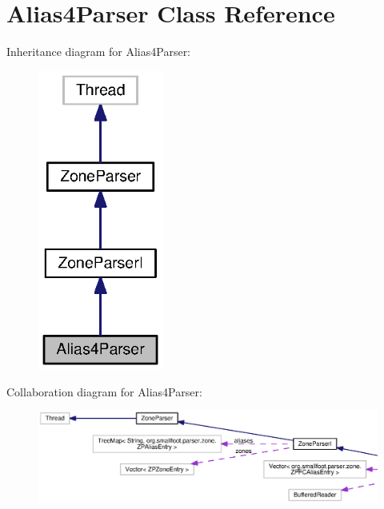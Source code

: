 \section{Alias4\+Parser Class Reference}
\label{classorg_1_1smallfoot_1_1parser_1_1zone_1_1Alias4Parser}


Inheritance diagram for Alias4\+Parser\+:\nopagebreak
\begin{figure}[H]
\begin{center}
\leavevmode
\includegraphics[width=116pt]{classorg_1_1smallfoot_1_1parser_1_1zone_1_1Alias4Parser__inherit__graph}
\end{center}
\end{figure}


Collaboration diagram for Alias4\+Parser\+:\nopagebreak
\begin{figure}[H]
\begin{center}
\leavevmode
\includegraphics[width=350pt]{classorg_1_1smallfoot_1_1parser_1_1zone_1_1Alias4Parser__coll__graph}
\end{center}
\end{figure}
